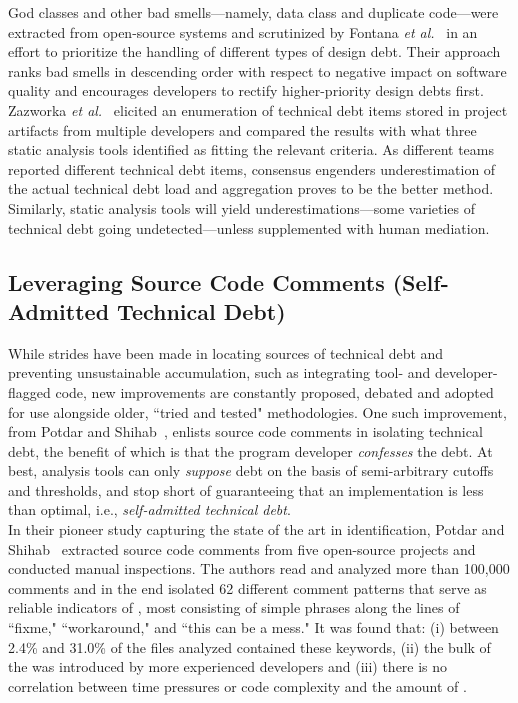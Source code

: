 God classes and other bad smells---namely, data class and duplicate code---were extracted from open-source systems and scrutinized by Fontana \textit{et al.}~\cite{fontana2013code} in an effort to prioritize the handling of different types of design debt. Their approach ranks bad smells in descending order with respect to negative impact on software quality and encourages developers to rectify higher-priority design debts first.\\

Zazworka \textit{et al.}~\cite{zazworka2011investigating} elicited an enumeration of technical debt items stored in project artifacts from multiple developers and compared the results with what three static analysis tools identified as fitting the relevant criteria. As different teams reported different technical debt items, consensus engenders underestimation of the actual technical debt load and aggregation proves to be the better method. Similarly, static analysis tools  will yield underestimations---some varieties of technical debt going undetected---unless supplemented with human mediation.

\subsection{Leveraging Source Code Comments (Self-Admitted Technical Debt)}

While strides have been made in locating sources of technical debt and preventing unsustainable accumulation, such as integrating tool- and developer-flagged code, new improvements are constantly proposed, debated and adopted for use alongside older, ``tried and tested" methodologies. One such improvement, from Potdar and Shihab~\cite{ICSM_PotdarS14}, enlists source code comments in isolating technical debt, the benefit of which is that the program developer \emph{confesses} the debt. At best, analysis tools can only \emph{suppose} debt on the basis of semi-arbitrary cutoffs and thresholds, and stop short of guaranteeing that an implementation is less than optimal, i.e., \emph{self-admitted technical debt}.\\

In their pioneer study capturing the state of the art in \SATD identification, Potdar and Shihab~\cite{ICSM_PotdarS14} extracted source code comments from five open-source projects and conducted manual inspections. The authors read and analyzed more than 100,000 comments and in the end isolated 62 different comment patterns that serve as reliable indicators of \SATD, most consisting of simple phrases along the lines of ``fixme," ``workaround," and ``this can be a mess." It was found that: (i) between 2.4\% and 31.0\% of the files analyzed contained these keywords, (ii) the bulk of the \SATD was introduced by more experienced developers and (iii) there is no correlation between time pressures or code complexity and the amount of \SATD.\\

